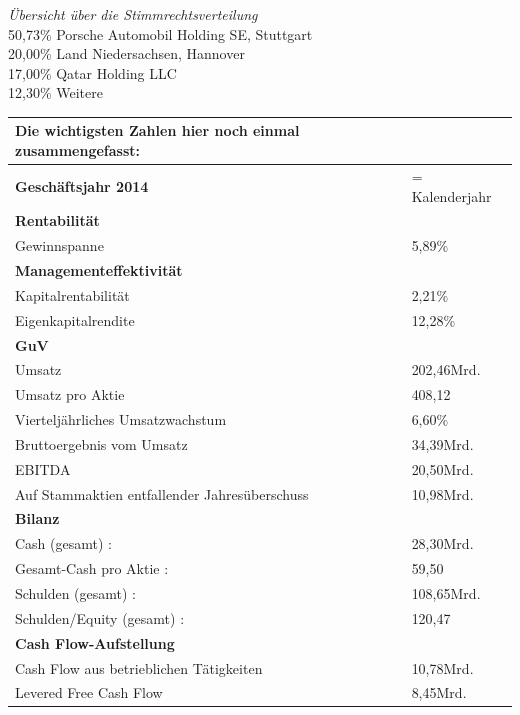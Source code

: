 \documentclass[12pt]{article}
\begin{document}
\textit{Übersicht über die Stimmrechtsverteilung} \\
50,73\% Porsche Automobil Holding SE, Stuttgart\\
20,00\% Land Niedersachsen, Hannover\\
17,00\% Qatar Holding LLC\\
12,30\% Weitere
\begin{table}
\begin{tabular}{|p{}|p{}|}
\hline

Die wichtigsten Zahlen hier noch einmal zusammengefasst:  & \cite{yahoofinanzenvw} \\  \hline
\textbf{Geschäftsjahr 2014}  & = Kalenderjahr \\  \hline
\textbf{Rentabilität}  & \\  \hline
 Gewinnspanne &   5,89\% \\ \hline
 \textbf{Managementeffektivität}  & \\  \hline
Kapitalrentabilität  & 2,21\%  \\  
Eigenkapitalrendite  &   12,28\%  \\  \hline
 \textbf{GuV}  & \\  \hline

 Umsatz &   202,46Mrd. \\  
 Umsatz pro Aktie &  408,12  \\  
 
Vierteljährliches Umsatzwachstum &   6,60\% \\  
 Bruttoergebnis vom Umsatz &34,39Mrd.    \\  
EBITDA  &  20,50Mrd.  \\  
 Auf Stammaktien entfallender Jahresüberschuss  &  10,98Mrd.  \\  \hline
  \textbf{Bilanz}  & \\  \hline


Cash (gesamt) : &  	28,30Mrd.  \\  

Gesamt-Cash pro Aktie : & 59,50   \\  
Schulden (gesamt) : &   108,65Mrd. \\  
 Schulden/Equity (gesamt) :&  	120,47  \\  \hline
   \textbf{Cash Flow-Aufstellung}  & \\  \hline

Cash Flow aus betrieblichen Tätigkeiten  &  10,78Mrd.  \\  
Levered Free Cash Flow  &  8,45Mrd.  \\  \hline

\end{tabular}
\end{table}\FloatBarrier
\end{document}

